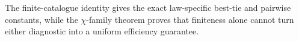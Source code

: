 The finite-catalogue identity gives the exact law-specific best-tie and pairwise constants, while the \(\chi\)-family theorem proves that finiteness alone cannot turn either diagnostic into a uniform efficiency guarantee.